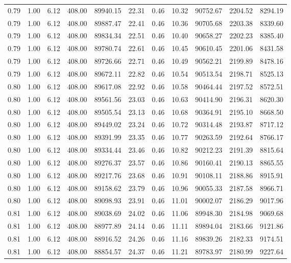 \begin{table}[!ht]
\begin{tabular}{rrrrrrrrrrr}
0.79 & 1.00 & 6.12 & 408.00 & 89940.15 & 22.31 & 0.46 & 10.32 & 90752.67 & 2204.52 & 8294.19 \\
0.79 & 1.00 & 6.12 & 408.00 & 89887.47 & 22.41 & 0.46 & 10.36 & 90705.68 & 2203.38 & 8339.60 \\
0.79 & 1.00 & 6.12 & 408.00 & 89834.34 & 22.51 & 0.46 & 10.40 & 90658.27 & 2202.23 & 8385.40 \\
0.79 & 1.00 & 6.12 & 408.00 & 89780.74 & 22.61 & 0.46 & 10.45 & 90610.45 & 2201.06 & 8431.58 \\
0.79 & 1.00 & 6.12 & 408.00 & 89726.66 & 22.71 & 0.46 & 10.49 & 90562.21 & 2199.89 & 8478.16 \\
0.79 & 1.00 & 6.12 & 408.00 & 89672.11 & 22.82 & 0.46 & 10.54 & 90513.54 & 2198.71 & 8525.13 \\
0.80 & 1.00 & 6.12 & 408.00 & 89617.08 & 22.92 & 0.46 & 10.58 & 90464.44 & 2197.52 & 8572.51 \\
0.80 & 1.00 & 6.12 & 408.00 & 89561.56 & 23.03 & 0.46 & 10.63 & 90414.90 & 2196.31 & 8620.30 \\
0.80 & 1.00 & 6.12 & 408.00 & 89505.54 & 23.13 & 0.46 & 10.68 & 90364.91 & 2195.10 & 8668.50 \\
0.80 & 1.00 & 6.12 & 408.00 & 89449.02 & 23.24 & 0.46 & 10.72 & 90314.48 & 2193.87 & 8717.12 \\
0.80 & 1.00 & 6.12 & 408.00 & 89391.99 & 23.35 & 0.46 & 10.77 & 90263.59 & 2192.64 & 8766.17 \\
0.80 & 1.00 & 6.12 & 408.00 & 89334.44 & 23.46 & 0.46 & 10.82 & 90212.23 & 2191.39 & 8815.64 \\
0.80 & 1.00 & 6.12 & 408.00 & 89276.37 & 23.57 & 0.46 & 10.86 & 90160.41 & 2190.13 & 8865.55 \\
0.80 & 1.00 & 6.12 & 408.00 & 89217.76 & 23.68 & 0.46 & 10.91 & 90108.11 & 2188.86 & 8915.91 \\
0.80 & 1.00 & 6.12 & 408.00 & 89158.62 & 23.79 & 0.46 & 10.96 & 90055.33 & 2187.58 & 8966.71 \\
0.80 & 1.00 & 6.12 & 408.00 & 89098.93 & 23.91 & 0.46 & 11.01 & 90002.07 & 2186.29 & 9017.96 \\
0.81 & 1.00 & 6.12 & 408.00 & 89038.69 & 24.02 & 0.46 & 11.06 & 89948.30 & 2184.98 & 9069.68 \\
0.81 & 1.00 & 6.12 & 408.00 & 88977.89 & 24.14 & 0.46 & 11.11 & 89894.04 & 2183.66 & 9121.86 \\
0.81 & 1.00 & 6.12 & 408.00 & 88916.52 & 24.26 & 0.46 & 11.16 & 89839.26 & 2182.33 & 9174.51 \\
0.81 & 1.00 & 6.12 & 408.00 & 88854.57 & 24.37 & 0.46 & 11.21 & 89783.97 & 2180.99 & 9227.64 \\

\end{tabular}
\end{table}
